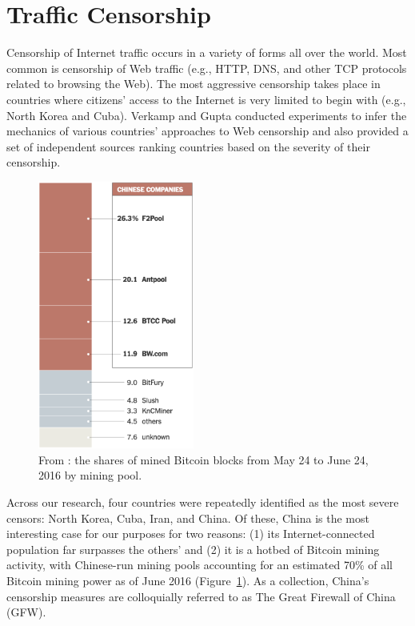 \section{Traffic Censorship}
Censorship of Internet traffic occurs in a variety of forms all over the world. Most common is censorship of Web traffic (e.g., HTTP, DNS, and other TCP protocols related to browsing the Web). The most aggressive censorship takes place in countries where citizens' access to the Internet is very limited to begin with (e.g., North Korea and Cuba). Verkamp and Gupta \cite{Verkamp2012} conducted experiments to infer the mechanics of various countries' approaches to Web censorship and also provided a set of independent sources ranking countries based on the severity of their censorship. 

\begin{figure}[h]
\centering
\includegraphics[height=250pt]{Images/NYT-Bitcoin-China.png}
\caption{From \cite{Popper2016}: the shares of mined Bitcoin blocks from May 24 to June 24, 2016 by mining pool.}
\label{fig:BTCPools}
\end{figure}

Across our research, four countries were repeatedly identified as the most severe censors: North Korea, Cuba, Iran, and China. Of these, China is the most interesting case for our purposes for two reasons: (1) its Internet-connected population far surpasses the others' and (2) it is a hotbed of Bitcoin mining activity, with Chinese-run mining pools accounting for an estimated 70\% of all Bitcoin mining power as of June 2016 (Figure~\ref{fig:BTCPools}). As a collection, China's censorship measures are colloquially referred to as The Great Firewall of China (GFW).